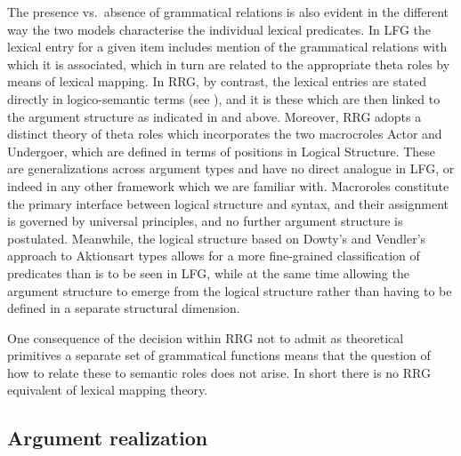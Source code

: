 \documentclass[output=paper,hidelinks]{langscibook}
\begin{document}
The presence vs.\ absence of grammatical relations is also evident in the different way the two models characterise the individual lexical predicates. In LFG the lexical entry for a given item includes mention of the grammatical relations with which it is associated, which in turn are related to the appropriate theta roles by means of lexical mapping. In RRG, by contrast, the lexical entries are stated directly in logico-semantic terms (see ), and it is these which are then linked to the argument structure as indicated in  and  above. Moreover, RRG adopts a distinct theory of theta roles which incorporates the two macrocroles Actor and Undergoer, which are defined in terms of positions in Logical Structure. These are generalizations across argument types and have no direct analogue in LFG, or indeed in any other framework which we are familiar with. Macroroles constitute the primary interface between logical structure and syntax, and their assignment is governed by universal principles, and no further argument structure is postulated. Meanwhile, the logical structure based on Dowty's and Vendler's approach to Aktionsart types allows for a more fine-grained classification of predicates than is to be seen in LFG, while at the same time allowing the argument structure to emerge from the logical structure rather than having to be defined in a separate structural dimension.

One consequence of the decision within RRG not to admit as theoretical primitives a separate set of grammatical functions means that the question of how to relate these to semantic roles does not arise. In short there is no RRG equivalent of lexical mapping theory.

\subsection{Argument realization}
\label{sec:RRG:3.3}
\end{document}
